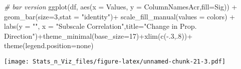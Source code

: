 \documentclass[
]{article}
\newenvironment{Shaded}{\begin{snugshade}}{\end{snugshade}}
\newcommand{\AttributeTok}[1]{\textcolor[rgb]{0.77,0.63,0.00}{#1}}
\newcommand{\CommentTok}[1]{\textcolor[rgb]{0.56,0.35,0.01}{\textit{#1}}}
\newcommand{\DecValTok}[1]{\textcolor[rgb]{0.00,0.00,0.81}{#1}}
\newcommand{\FunctionTok}[1]{\textcolor[rgb]{0.00,0.00,0.00}{#1}}
\newcommand{\NormalTok}[1]{#1}
\newcommand{\OtherTok}[1]{\textcolor[rgb]{0.56,0.35,0.01}{#1}}
\newcommand{\SpecialCharTok}[1]{\textcolor[rgb]{0.00,0.00,0.00}{#1}}
\newcommand{\StringTok}[1]{\textcolor[rgb]{0.31,0.60,0.02}{#1}}
\begin{document}
\begin{Shaded}
\begin{Highlighting}[]
\CommentTok{\# bar version}
\FunctionTok{ggplot}\NormalTok{(df, }\FunctionTok{aes}\NormalTok{(}\AttributeTok{x =}\NormalTok{ Values, }\AttributeTok{y =}\NormalTok{ ColumnNamesAcr,}\AttributeTok{fill=}\NormalTok{Sig)) }\SpecialCharTok{+}
  \FunctionTok{geom\_bar}\NormalTok{(}\AttributeTok{size=}\DecValTok{3}\NormalTok{,}\AttributeTok{stat =} \StringTok{"identity"}\NormalTok{)}\SpecialCharTok{+}
  \FunctionTok{scale\_fill\_manual}\NormalTok{(}\AttributeTok{values =}\NormalTok{ colors) }\SpecialCharTok{+}
  \FunctionTok{labs}\NormalTok{(}\AttributeTok{y =} \StringTok{""}\NormalTok{, }\AttributeTok{x =} \StringTok{"Subscale Correlation"}\NormalTok{,}\AttributeTok{title=}\StringTok{"Change in Prop. Direction"}\NormalTok{)}\SpecialCharTok{+}\FunctionTok{theme\_minimal}\NormalTok{(}\AttributeTok{base\_size=}\DecValTok{17}\NormalTok{)}\SpecialCharTok{+}\FunctionTok{xlim}\NormalTok{(}\FunctionTok{c}\NormalTok{(}\SpecialCharTok{{-}}\NormalTok{.}\DecValTok{3}\NormalTok{,.}\DecValTok{8}\NormalTok{))}\SpecialCharTok{+}
  \FunctionTok{theme}\NormalTok{(}\AttributeTok{legend.position=}\StringTok{\textquotesingle{}none\textquotesingle{}}\NormalTok{)}
\end{Highlighting}
\end{Shaded}

\texttt{[image: Stats\_n\_Viz\_files/figure-latex/unnamed-chunk-21-3.pdf]}

\begin{Shaded}
\end{Shaded}
\end{document}
